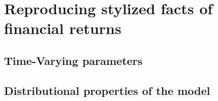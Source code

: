\newpage

\section{Reproducing stylized facts of financial returns}

\subsection{Time-Varying parameters}

 \subsection{Distributional properties of the model}
 
